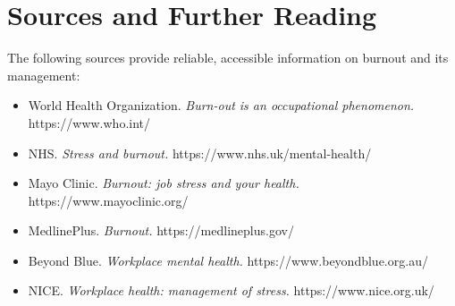 \section*{Sources and Further Reading}
The following sources provide reliable, accessible information on burnout and its management:
\begin{itemize}
    \item World Health Organization. \textit{Burn-out is an occupational phenomenon.} https://www.who.int/
    \item NHS. \textit{Stress and burnout.} https://www.nhs.uk/mental-health/
    \item Mayo Clinic. \textit{Burnout: job stress and your health.} https://www.mayoclinic.org/
    \item MedlinePlus. \textit{Burnout.} https://medlineplus.gov/
    \item Beyond Blue. \textit{Workplace mental health.} https://www.beyondblue.org.au/
    \item NICE. \textit{Workplace health: management of stress.} https://www.nice.org.uk/
\end{itemize}
